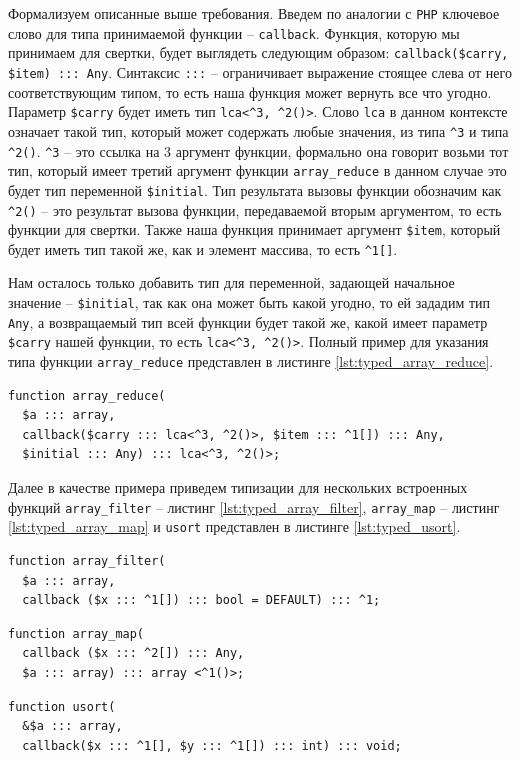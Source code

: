 Формализуем описанные выше требования.
Введем по аналогии с \verb|PHP| ключевое слово для типа принимаемой функции -- \verb|callback|.
Функция, которую мы принимаем для свертки, будет выглядеть следующим образом: \verb|callback($carry, $item) ::: Any|.
Синтаксис \verb|:::| -- ограничивает выражение стоящее слева от него соответствующим типом, то есть наша функция может вернуть все что угодно.
Параметр \verb|$carry| будет иметь тип \verb|lca<^3, ^2()>|.
Слово \verb|lca| в данном контексте означает такой тип, который может содержать любые значения, из типа \verb|^3| и типа \verb|^2()|.
\verb|^3| -- это ссылка на 3 аргумент функции, формально она говорит возьми тот тип, который имеет третий аргумент функции \verb|array_reduce| в данном случае это будет тип переменной \verb|$initial|.
Тип результата вызовы функции обозначим как \verb|^2()| -- это результат вызова функции, передаваемой вторым аргументом, то есть функции для свертки.
Также наша функция принимает аргумент \verb|$item|, который будет иметь тип такой же, как и элемент массива, то есть \verb|^1[]|.

Нам осталось только добавить тип для переменной, задающей начальное значение -- \verb|$initial|, так как она может быть какой угодно, то ей зададим тип \verb|Any|,  а возвращаемый тип всей функции будет такой же, какой имеет параметр \verb|$carry| нашей функции, то есть \verb|lca<^3, ^2()>|.
Полный пример для указания типа функции \verb|array_reduce| представлен в листинге \ref{lst:typed_array_reduce}.
\begin{lstlisting}[caption={Пример типизации функции array\_reduce},label={lst:typed_array_reduce}]
function array_reduce(
  $a ::: array,
  callback($carry ::: lca<^3, ^2()>, $item ::: ^1[]) ::: Any,
  $initial ::: Any) ::: lca<^3, ^2()>;
\end{lstlisting}

Далее в качестве примера приведем типизации для нескольких встроенных функций \verb|array_filter| -- листинг \ref{lst:typed_array_filter}, \verb|array_map| -- листинг \ref{lst:typed_array_map} и \verb|usort| представлен в листинге \ref{lst:typed_usort}.
\begin{lstlisting}[caption={Пример типизации функции array\_filter},label={lst:typed_array_filter}]
function array_filter(
  $a ::: array,
  callback ($x ::: ^1[]) ::: bool = DEFAULT) ::: ^1;
\end{lstlisting}
\begin{lstlisting}[caption={Пример типизации функции array\_map},label={lst:typed_array_map}]
function array_map(
  callback ($x ::: ^2[]) ::: Any,
  $a ::: array) ::: array <^1()>;
\end{lstlisting}
\begin{lstlisting}[caption={Пример типизации функции usort},label={lst:typed_usort}]
function usort(
  &$a ::: array,
  callback($x ::: ^1[], $y ::: ^1[]) ::: int) ::: void;
\end{lstlisting}

